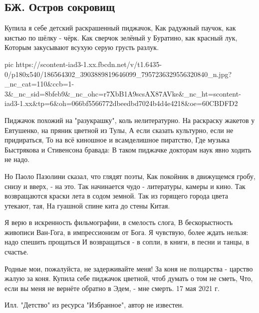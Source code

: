  
 
 
 
 
\subsection{БЖ. Остров сокровищ}

Купила я себе детский раскрашенный пиджачок,
Как радужный паучок, как кистью по шёлку - чёрк.
Как сверчок зелёный у Буратино, как красный лук,
Которым закусывают всухую серую грусть разлук.

\ifcmt
  pic https://scontent-iad3-1.xx.fbcdn.net/v/t1.6435-0/p180x540/186564302_3903889819646099_7957236329556320840_n.jpg?_nc_cat=110&ccb=1-3&_nc_sid=8bfeb9&_nc_ohc=r7XbB1A9scsAX87AVke&_nc_ht=scontent-iad3-1.xx&tp=6&oh=066bf5566772dbeedbd7024b4d4e4218&oe=60CBDFD2
\fi

Пиджачок похожий на "разукрашку", коль нелитературно.
На раскраску жакетов у Евтушенко, на пряник цветной из Тулы,
А если сказать культурно, если не придираться,
То на всё киношное и всамделишное пиратство,
Где музыка Быстрякова и Стивенсона бравада:
В таком пиджачке докторам наук явно ходить не надо.

Но Паоло Пазолини сказал, что глядят поэты,
Как покойник в движущемся гробу, снизу и вверх, - на это.
Так начинается чудо - литературы, камеры и кино.
Так возвращаются краски лета в содом земной.
Так из горящего города цвета утекают, тая,
На гуашной спине кита до стены Китая.

Я верю в искренность фильмографии, в смелость слога,
В бескорыстность живописи Ван-Гога, в импрессионизм от Бога.
Я чувствую, более ждать нельзя: надо спешить прощаться
И возвращаться - в сопли, в книги, в песни и танцы, в счастье.

Родные мои, пожалуйста, не задерживайте меня!
За коня не полцарства - царство жалую за коня.
Купила себе пиджачок цветной, чтоб думать о том не сметь,
Что, если вы меня не вернёте обратно в Эдем, - мне смерть.
17 мая 2021 г.

Илл. "Детство" из ресурса "Избранное", автор не известен.
